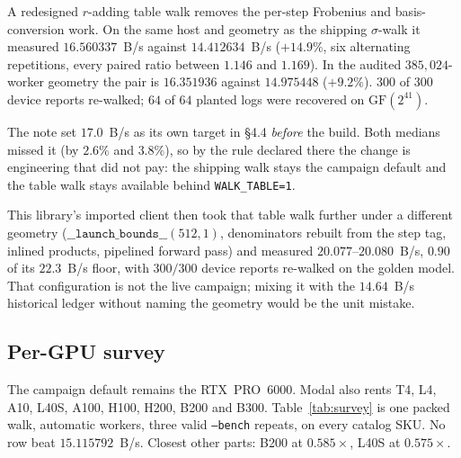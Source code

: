 A redesigned $r$-adding table walk removes the per-step Frobenius and
basis-conversion work. On the same host and geometry as the shipping
$\sigma$-walk it measured $16.560337$~B/s against $14.412634$~B/s
($+14.9\%$, six alternating repetitions, every paired ratio between
$1.146$ and $1.169$). In the audited $385{,}024$-worker geometry the
pair is $16.351936$ against $14.975448$ ($+9.2\%$). $300$ of $300$
device reports re-walked; $64$ of $64$ planted logs were recovered on
$\mathrm{GF}(2^{41})$.

The note set $17.0$~B/s as its own target in §4.4 \emph{before} the
build. Both medians missed it (by $2.6\%$ and $3.8\%$), so by the rule
declared there the change is engineering that did not pay: the
shipping walk stays the campaign default and the table walk stays
available behind \texttt{WALK\_TABLE=1}.

This library's imported client then took that table walk further under
a different geometry ($\mathtt{\_\_launch\_bounds\_\_}(512,1)$,
denominators rebuilt from the step tag, inlined products, pipelined
forward pass) and measured $20.077$--$20.080$~B/s, $0.90$ of its
$22.3$~B/s floor, with $300/300$ device reports re-walked on the
golden model. That configuration is not the
live campaign; mixing it with the $14.64$~B/s historical ledger
without naming the geometry would be the unit mistake.

\subsection{Per-GPU survey}

The campaign default remains the RTX~PRO~6000. Modal also rents T4,
L4, A10, L40S, A100, H100, H200, B200 and B300. Table~\ref{tab:survey}
is one packed walk, automatic workers, three valid \texttt{--bench}
repeats, on every catalog SKU. No row beat $15.115792$~B/s. Closest
other parts: B200 at $0.585\times$, L40S at
$0.575\times$.

